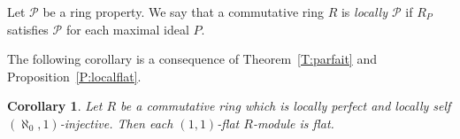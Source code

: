 \documentclass{amsart}
\newtheorem{theorem}{Theorem}[section]
\newtheorem{proposition}[theorem]{Proposition}
\newtheorem{corollary}[theorem]{Corollary}
\newtheorem{remark}[theorem]{Remark}
\begin{document}
Let $\mathcal{P}$ be a ring property. We say that a commutative ring $R$ is {\it locally $\mathcal{P}$} if $R_P$ satisfies $\mathcal{P}$ for each maximal ideal $P$. 

The following corollary is a consequence of Theorem~\ref{T:parfait} and Proposition~\ref{P:localflat}.
\begin{corollary}
\label{C:LocPer} Let $R$ be a commutative ring which is locally perfect and locally self $(\aleph_0,1)$-injective. Then each $(1,1)$-flat $R$-module is flat.
\end{corollary}


 


\end{document}

